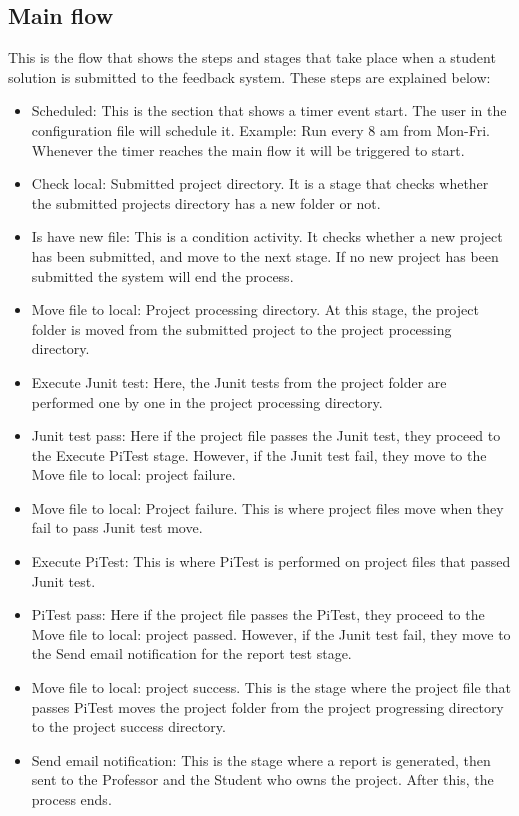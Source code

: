 \subsection{ Main flow}
This is the flow that shows the steps and stages that take place when a student solution is submitted to the feedback system. These steps are explained below:
\begin{itemize}
\item Scheduled: This is the section that shows a timer event start. The user in the configuration file will schedule it. Example: Run every 8 am from Mon-Fri. Whenever the timer reaches the main flow it will be triggered to start.
\item Check local: Submitted project directory. It is a stage that checks whether the submitted projects directory has a new folder or not.
\item Is have new file: This is a condition activity. It checks whether a new project has been submitted, and move to the next stage. If no new project has been submitted the system will end the process.
\item Move file to local: Project processing directory. At this stage, the project folder is moved from the submitted project to the project processing directory.
\item Execute Junit test: Here, the Junit tests from the project folder are performed one by one in the project processing directory.
\item Junit test pass: Here if the project file passes the Junit test, they proceed to the Execute PiTest stage. However, if the Junit test fail, they move to the Move file to local: project failure.
\item Move file to local: Project failure. This is where project files move when they fail to pass Junit test move. 
\item Execute PiTest: This is where PiTest is performed on project files that passed Junit test. 
\item PiTest pass: Here if the project file passes the PiTest, they proceed to the Move file to local: project passed. However, if the Junit test fail, they move to the Send email notification for the report test stage.
\item Move file to local: project success. This is the stage where the project file that passes PiTest moves the project folder from the project progressing directory to the project success directory.
\item Send email notification: This is the stage where a report is generated, then sent to the Professor and the Student who owns the project. After this, the process ends. 
\newpage
\end{itemize}
